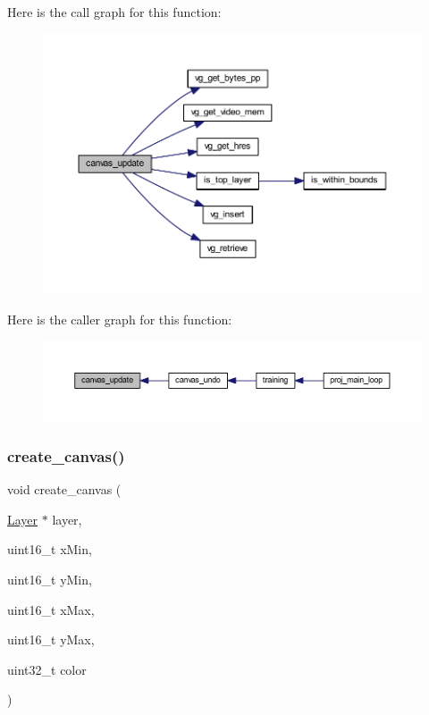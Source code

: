 Here is the call graph for this function\+:\nopagebreak
\begin{figure}[H]
\begin{center}
\leavevmode
\includegraphics[width=350pt]{group__canvas_gab462a38a3f3a612931c008e28e816a8d_cgraph}
\end{center}
\end{figure}
Here is the caller graph for this function\+:\nopagebreak
\begin{figure}[H]
\begin{center}
\leavevmode
\includegraphics[width=350pt]{group__canvas_gab462a38a3f3a612931c008e28e816a8d_icgraph}
\end{center}
\end{figure}
\mbox{\label{group__canvas_ga8ca57c812327763152c635d235e3104e}} 
\subsubsection{\texorpdfstring{create\+\_\+canvas()}{create\_canvas()}}
{\footnotesize\ttfamily void create\+\_\+canvas (\begin{DoxyParamCaption}\item[{\mbox{\hyperlink{struct_layer}{Layer}} $\ast$}]{layer,  }\item[{uint16\+\_\+t}]{x\+Min,  }\item[{uint16\+\_\+t}]{y\+Min,  }\item[{uint16\+\_\+t}]{x\+Max,  }\item[{uint16\+\_\+t}]{y\+Max,  }\item[{uint32\+\_\+t}]{color }\end{DoxyParamCaption})}



